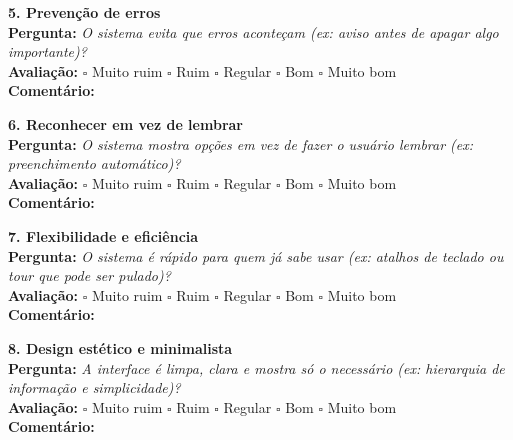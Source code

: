\textbf{5. Prevenção de erros} \\
\textbf{Pergunta:} \textit{O sistema evita que erros aconteçam (ex: aviso antes de apagar algo importante)?} \\
\textbf{Avaliação:} $\square$ Muito ruim \hspace{0.5cm} $\square$ Ruim \hspace{0.5cm} $\square$ Regular \hspace{0.5cm} $\square$ Bom \hspace{0.5cm} $\square$ Muito bom \\
\textbf{Comentário:} \underline{\hspace{12cm}}

\textbf{6. Reconhecer em vez de lembrar} \\
\textbf{Pergunta:} \textit{O sistema mostra opções em vez de fazer o usuário lembrar (ex: preenchimento automático)?} \\
\textbf{Avaliação:} $\square$ Muito ruim \hspace{0.5cm} $\square$ Ruim \hspace{0.5cm} $\square$ Regular \hspace{0.5cm} $\square$ Bom \hspace{0.5cm} $\square$ Muito bom \\
\textbf{Comentário:} \underline{\hspace{12cm}}

\textbf{7. Flexibilidade e eficiência} \\
\textbf{Pergunta:} \textit{O sistema é rápido para quem já sabe usar (ex: atalhos de teclado ou tour que pode ser pulado)?} \\
\textbf{Avaliação:} $\square$ Muito ruim \hspace{0.5cm} $\square$ Ruim \hspace{0.5cm} $\square$ Regular \hspace{0.5cm} $\square$ Bom \hspace{0.5cm} $\square$ Muito bom \\
\textbf{Comentário:} \underline{\hspace{12cm}}

\textbf{8. Design estético e minimalista} \\
\textbf{Pergunta:} \textit{A interface é limpa, clara e mostra só o necessário (ex: hierarquia de informação e simplicidade)?} \\
\textbf{Avaliação:} $\square$ Muito ruim \hspace{0.5cm} $\square$ Ruim \hspace{0.5cm} $\square$ Regular \hspace{0.5cm} $\square$ Bom \hspace{0.5cm} $\square$ Muito bom \\
\textbf{Comentário:} \underline{\hspace{12cm}}

